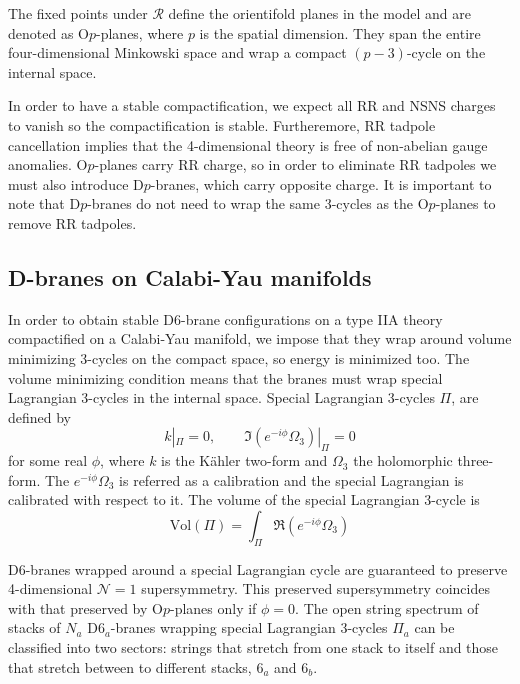The fixed points under $\mathcal R$ define the orientifold planes in the model and are denoted
as O$p$-planes, where $p$ is the spatial dimension.
They span the entire four-dimensional Minkowski space and wrap a compact $(p-3)$-cycle on the internal space.

In order to have a stable compactification, we expect all RR and NSNS charges to vanish
so the compactification is stable.
Furtheremore, RR tadpole cancellation implies that the 4-dimensional theory is free of non-abelian gauge anomalies.
O$p$-planes carry RR charge, so in order to eliminate RR tadpoles we must also introduce D$p$-branes,
which carry opposite charge.
It is important to note that D$p$-branes do not need to wrap the same 3-cycles as the O$p$-planes
to remove RR tadpoles.

\subsection{D-branes on Calabi-Yau manifolds}

In order to obtain stable D6-brane configurations on a type IIA theory compactified on a Calabi-Yau manifold, 
we impose that they wrap around volume minimizing 3-cycles on the compact space, so energy is minimized too.
The volume minimizing condition means that the branes must wrap special Lagrangian 3-cycles in the internal space.
Special Lagrangian 3-cycles $\Pi$, are defined by
\begin{equation}
  k|_\Pi = 0 , \qquad \Im (e^{-i\phi}\Omega_3)|_\Pi=0
\end{equation}
for some real $\phi$, where $k$ is the Kähler two-form and $\Omega_3$ the holomorphic three-form.
The $e^{-i\phi}\Omega_3$ is referred as a calibration and the special Lagrangian is calibrated with respect to it.%
The volume of the special Lagrangian 3-cycle is
\begin{equation}
  \mathrm{Vol}(\Pi)=\int_\Pi \Re(e^{-i\phi}\Omega_3)
\end{equation}

D6-branes wrapped around a special Lagrangian cycle are guaranteed to preserve 4-dimensional $\mathcal N=1$ supersymmetry. 
This preserved supersymmetry coincides with that preserved by O$p$-planes only if $\phi=0$.
The open string spectrum of stacks of $N_a$ D$6_a$-branes wrapping special Lagrangian 3-cycles $\Pi_a$ 
can be classified into two sectors: strings that stretch from one stack to itself and those that stretch between to different stacks, $6_a$ and $6_b$.


